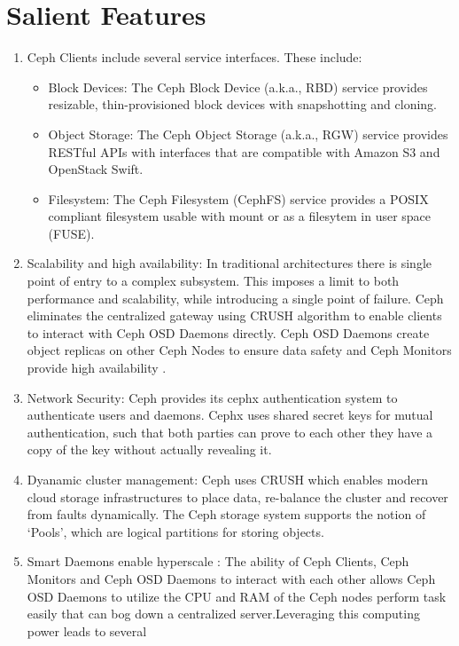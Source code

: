 \documentclass[9pt,twocolumn,twoside]{styles/osajnl}
\begin{document}
\section{Salient Features}
\begin{enumerate}
\item Ceph Clients include several service interfaces. These include:
\begin{itemize}
\item Block Devices: The Ceph Block Device (a.k.a., RBD) service
  provides resizable, thin-provisioned block devices with snapshotting
  and cloning.
\item Object Storage: The Ceph Object Storage (a.k.a., RGW) service
  provides RESTful APIs with interfaces that are compatible with
  Amazon S3 and OpenStack Swift.
\item Filesystem: The Ceph Filesystem (CephFS) service provides a
  POSIX compliant filesystem usable with mount or as a filesytem in
  user space (FUSE).
\end{itemize}
\item Scalability and high availability: In traditional architectures
  there is single point of entry to a complex subsystem. This imposes
  a limit to both performance and scalability, while introducing a
  single point of failure.  Ceph eliminates the centralized gateway
  using CRUSH algorithm to enable clients to interact with Ceph OSD
  Daemons directly. Ceph OSD Daemons create object replicas on other
  Ceph Nodes to ensure data safety and Ceph Monitors provide high
  availability \cite{www-ceph-scalable}.
\item Network Security: Ceph provides its cephx authentication system
  to authenticate users and daemons. Cephx uses shared secret keys for
  mutual authentication, such that both parties can prove to each
  other they have a copy of the key without actually revealing it.
\item Dyanamic cluster management: Ceph uses CRUSH which enables
  modern cloud storage infrastructures to place data, re-balance the
  cluster and recover from faults dynamically. The Ceph storage system
  supports the notion of ‘Pools’, which are logical partitions for
  storing objects.
\item Smart Daemons enable hyperscale \cite{www-ceph-daemon}: The
  ability of Ceph Clients, Ceph Monitors and Ceph OSD Daemons to
  interact with each other allows Ceph OSD Daemons to utilize the CPU
  and RAM of the Ceph nodes perform task easily that can bog down a
  centralized server.Leveraging this computing power leads to several

\end{enumerate}
\end{document}
